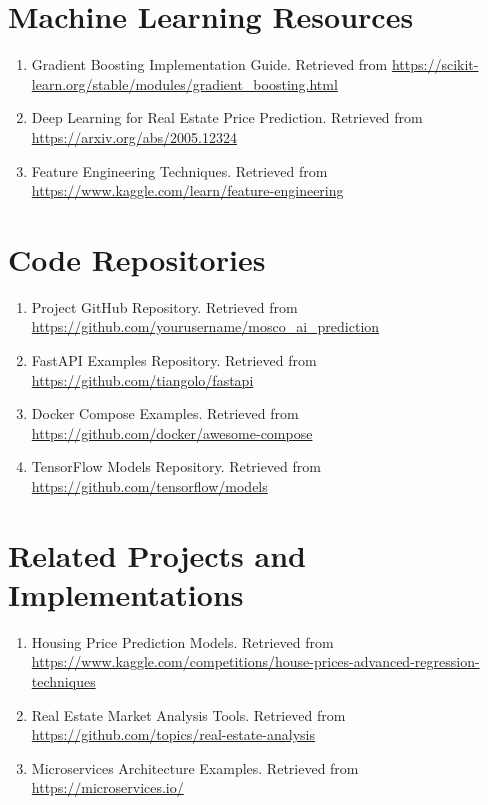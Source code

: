 \documentclass[12pt,a4paper]{report}
\begin{document}
\section{Machine Learning Resources}
\begin{enumerate}
    \item Gradient Boosting Implementation Guide. Retrieved from \url{https://scikit-learn.org/stable/modules/gradient_boosting.html}
    
    \item Deep Learning for Real Estate Price Prediction. Retrieved from \url{https://arxiv.org/abs/2005.12324}
    
    \item Feature Engineering Techniques. Retrieved from \url{https://www.kaggle.com/learn/feature-engineering}
\end{enumerate}

\section{Code Repositories}
\begin{enumerate}
    \item Project GitHub Repository. Retrieved from \url{https://github.com/yourusername/mosco_ai_prediction}
    
    \item FastAPI Examples Repository. Retrieved from \url{https://github.com/tiangolo/fastapi}
    
    \item Docker Compose Examples. Retrieved from \url{https://github.com/docker/awesome-compose}
    
    \item TensorFlow Models Repository. Retrieved from \url{https://github.com/tensorflow/models}
\end{enumerate}

\section{Related Projects and Implementations}
\begin{enumerate}
    \item Housing Price Prediction Models. Retrieved from \url{https://www.kaggle.com/competitions/house-prices-advanced-regression-techniques}
    
    \item Real Estate Market Analysis Tools. Retrieved from \url{https://github.com/topics/real-estate-analysis}
    
    \item Microservices Architecture Examples. Retrieved from \url{https://microservices.io/}
\end{enumerate}
\end{document}
